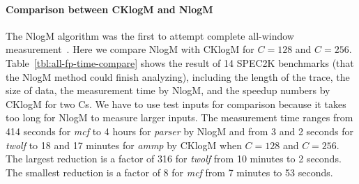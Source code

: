 \paragraph{Comparison between CKlogM and NlogM}
The NlogM algorithm was the first to attempt complete all-window
measurement~\cite{DingC:PPOPP08}.  Here we compare NlogM with
CKlogM for $C=128$ and $C=256$.  Table~\ref{tbl:all-fp-time-compare} shows
the result of 14 SPEC2K benchmarks (that the NlogM method could finish
analyzing), including the length of the trace,
the size of data, the measurement time by NlogM, and the speedup
numbers by CKlogM for two Cs.  We have to use test inputs for comparison because it
takes too long for NlogM to measure larger inputs.  The measurement
time ranges from 414 seconds for \emph{mcf} to 4 hours
for \emph{parser} by NlogM and from 3 and 2 seconds for \emph{twolf}
to 18 and 17 minutes for \emph{ammp} by CKlogM when $C=128$ and
$C=256$.  The largest reduction is a factor of 316 for \emph{twolf}
from 10 minutes to 2 seconds.  The smallest reduction is a factor of 8
for \emph{mcf} from 7 minutes to 53 seconds. 

